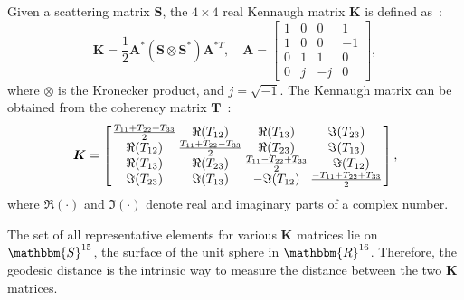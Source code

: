 \documentclass[journal]{IEEEtran}
\begin{document}
Given a scattering matrix $\bm{S}$, the $4 \times 4$ real Kennaugh matrix $\bm{K}$ is defined as~\cite{Pottier09}:
\begin{equation}
\bm{K} = \frac{1}{2}\bm{A}^*(\bm{S} \otimes \bm{S}^*) \bm{A}^{*T}, \quad \bm{A} = \left[
\begin{array}{cccc}
1 & 0 & 0 & 1\\
1 & 0 & 0 & -1\\
0 & 1 & 1 & 0\\
0 & j & -j & 0
\end{array}\right],
\end{equation}
where $\otimes$ is the Kronecker product, and  $j = \sqrt{-1}$.
The Kennaugh matrix can be obtained from the coherency matrix $\bm{T}$~\cite{PolarisationApplicationsRemoteSensing}:
\begin{equation}
\label{incoKen}
\bm{K} =
\left[\arraycolsep=.7pt
\begin{array}{cccc}
\frac{T_{11}+T_{22}+ T_{33}}{2} & \Re(T_{12}) & \Re(T_{13}) & \Im(T_{23})\\
\Re(T_{12}) & \frac{T_{11}+T_{22}-T_{33}}{2} & \Re(T_{23}) & \Im(T_{13})\\
\Re(T_{13}) & \Re(T_{23}) & \frac{T_{11}-T_{22}+T_{33}}{2} & - \Im(T_{12})\\
\Im(T_{23}) & \Im(T_{13}) & - \Im(T_{12}) &\frac{-T_{11}+T_{22}+T_{33}}{2}
\end{array}\right],
\end{equation}
where $\Re(\cdot)$ and $\Im(\cdot)$ denote real and imaginary parts of a complex number. 

The set of all representative elements for various $\bm{K}$ matrices lie on $\mathbbm{S}^{15}$, the surface of the unit sphere in $\mathbbm{R}^{16}$. 
Therefore, the geodesic distance is the intrinsic way to measure the distance between the two $\bm{K}$ matrices.
\end{document}
